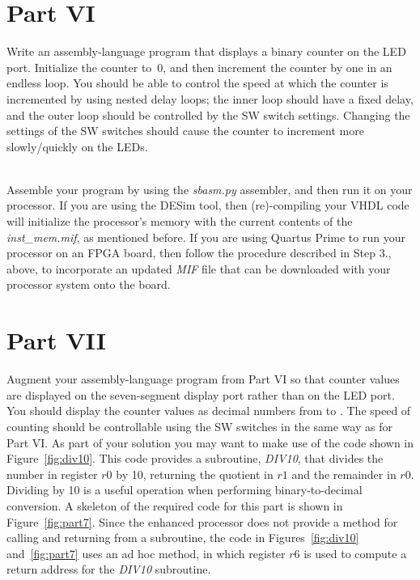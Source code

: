 \documentclass[epsfig,10pt,fullpage]{article} \addtolength{\textwidth}{1.5in}
\newcommand{\red}[1]{{\color{red}\sf{#1}}}
\begin{document}
\lstset{language=ASM,numbers=none,escapechar=|}
\section*{Part VI}
Write an assembly-language program that displays a binary counter on the LED port. Initialize 
the counter to~0, and then increment the counter by one in an endless loop. You should be
able to control the speed at which the counter is incremented by using nested delay loops;
the inner loop should have a fixed delay, and the outer loop should be controlled by the 
SW switch settings.  Changing the settings of the SW switches should cause the counter 
to increment more slowly/quickly on the LEDs. 

~\\
\noindent
Assemble your program by using the {\it sbasm.py} assembler, and then run it on
your processor. If you are using the DESim tool, then (re)-compiling your VHDL code will
initialize the processor's memory with the current contents of the {\it inst\_mem.mif}, 
as mentioned before. 
If you are using Quartus Prime to run your processor on an FPGA board, then follow the 
procedure described in Step 3., above, to incorporate an updated {\it MIF} file that can
be downloaded with your processor system onto the board.

\section*{Part VII}
Augment your assembly-language program from Part VI so that counter values are displayed
on the seven-segment display port rather than on the LED port. You should display the
counter values as decimal numbers from \texttt{\red{0}} to \texttt{\red{65535}}.
The speed of counting should be controllable using the SW switches in the same way as for
Part VI. As part of your solution you may want to make use of the code shown in 
Figure~\ref{fig:div10}. This code provides a subroutine, {\it DIV10}, that divides the number in
register $r0$ by 10, returning the quotient in $r1$ and the remainder in $r0$. 
Dividing by 10 is a useful operation when performing binary-to-decimal conversion. 
A skeleton of the required code for this part is shown in Figure~\ref{fig:part7}.
Since the enhanced processor does not provide a method for calling and returning from a
subroutine, the code in Figures~\ref{fig:div10} and~\ref{fig:part7} uses an ad hoc method,
in which register $r6$ is used to compute a return address for the {\it DIV10} subroutine.
\end{document}
